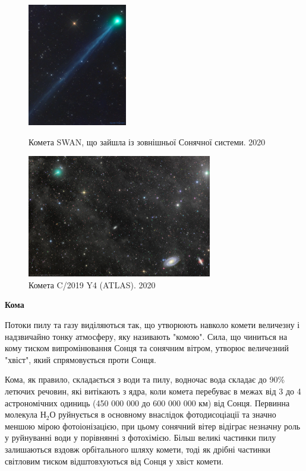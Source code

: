 \documentclass[a4paper]{article}
\begin{document}
    \begin{figure}[ht]
        \centering
        \vspace*{-2ex}
        \begin{minipage}[t]{0.356\textwidth}
            \includegraphics[height=203px]{SWAN.jpg}
            \vspace*{-2ex}
            \caption{Комета SWAN, що зайшла із зовнішньої Сонячної системи. 2020\cite{16}}
        \end{minipage}
        \hfill
        \begin{minipage}[t]{0.626\textwidth}
            \includegraphics[height=203px]{ATLAS.jpg}
            \vspace*{-5ex}
            \caption{Комета C/2019 Y4 (ATLAS). 2020\cite{17}}
        \end{minipage}
        \vspace*{-2ex}
    \end{figure}
    
    \textbf{Кома}

    Потоки пилу та газу виділяються так, що утворюють навколо комети величезну і надзвичайно тонку атмосферу, яку називають "комою". Сила, що чиниться на кому тиском випромінювання Сонця та сонячним вітром, утворює величезний "хвіст", який спрямовується проти Сонця.
    
    Кома, як правило, складається з води та пилу, водночас вода складає до 90\% летючих речовин, які витікають з ядра, коли комета перебуває в межах від 3 до 4 астрономічних одиниць (450 000 000 до 600 000 000 км) від Сонця. Первинна молекула Н$_2$О руйнується в основному внаслідок фотодисоціації та значно меншою мірою фотоіонізацією, при цьому сонячний вітер відіграє незначну роль у руйнуванні води у порівнянні з фотохімією. Більш великі частинки пилу залишаються вздовж орбітального шляху комети, тоді як дрібні частинки світловим тиском відштовхуються від Сонця у хвіст комети.
    
\end{document}

